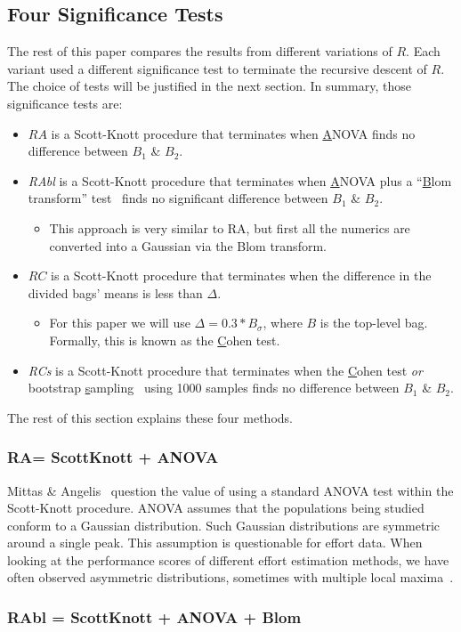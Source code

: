 \documentclass{sig-alternate}
\newcommand{\bi}{\begin{itemize}}
\newcommand{\ei}{\end{itemize}}
\begin{document}
\subsection{Four Significance Tests}

The rest of this paper compares the results from different variations of $R$. Each variant used
a different significance test to terminate the recursive descent of $R$. 
The choice of tests will
be justified in the next section. In summary,
those significance tests are:
\bi
\item
$RA$ is a Scott-Knott procedure  that terminates  when  \underline{A}NOVA
finds no difference  between $B_1$ \& $B_2$.
\item 
{\em RAbl} is a Scott-Knott procedure that terminates when \underline{A}NOVA plus a ``\underline{B}lom transform'' test~\cite{blom58}
finds no significant difference between $B_1$ \& $B_2$.
\bi
\item This approach is very similar to RA,  but first all the numerics are converted into a Gaussian
via the Blom transform.
\ei
\item
$RC$ is a Scott-Knott procedure that terminates when the
 difference in the divided bags' means is less than  $\Delta$.
\bi
\item For this paper we will use $\Delta = 0.3 * B_\sigma$, where $B$ is the top-level bag. Formally, this is known as the \underline{C}ohen test.
\ei
\item 
{\em RCs} is a Scott-Knott procedure that terminates when  the \underline{C}ohen test {\em or}
bootstrap \underline{s}ampling~\cite{efron93} using 1000 samples finds  no difference  between $B_1$ \& $B_2$.
\ei
The rest of this section explains these four methods.

\subsubsection{RA= ScottKnott + ANOVA}

Mittas \& Angelis~\cite{mittas12b} question the value of using a
standard ANOVA test within the Scott-Knott procedure.  ANOVA assumes
that the populations being studied conform to a Gaussian
distribution. Such Gaussian distributions are symmetric around a
single peak.  This assumption is questionable for effort data. When
looking at the performance scores of different effort estimation
methods, we have often observed asymmetric distributions, sometimes
with multiple local maxima~\cite{me06f}.

\subsubsection{RAbl = ScottKnott +  ANOVA + Blom}
\end{document}
